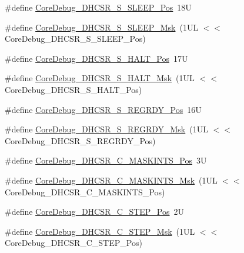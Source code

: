 \begin{DoxyCompactItemize}
\item 
\#define \mbox{\hyperlink{group___c_m_s_i_s___core_debug_ga349ccea33accc705595624c2d334fbcb}{Core\+Debug\+\_\+\+D\+H\+C\+S\+R\+\_\+\+S\+\_\+\+S\+L\+E\+E\+P\+\_\+\+Pos}}~18U
\item 
\#define \mbox{\hyperlink{group___c_m_s_i_s___core_debug_ga98d51538e645c2c1a422279cd85a0a25}{Core\+Debug\+\_\+\+D\+H\+C\+S\+R\+\_\+\+S\+\_\+\+S\+L\+E\+E\+P\+\_\+\+Msk}}~(1\+U\+L $<$$<$ Core\+Debug\+\_\+\+D\+H\+C\+S\+R\+\_\+\+S\+\_\+\+S\+L\+E\+E\+P\+\_\+\+Pos)
\item 
\#define \mbox{\hyperlink{group___c_m_s_i_s___core_debug_ga760a9a0d7f39951dc3f07d01f1f64772}{Core\+Debug\+\_\+\+D\+H\+C\+S\+R\+\_\+\+S\+\_\+\+H\+A\+L\+T\+\_\+\+Pos}}~17U
\item 
\#define \mbox{\hyperlink{group___c_m_s_i_s___core_debug_ga9f881ade3151a73bc5b02b73fe6473ca}{Core\+Debug\+\_\+\+D\+H\+C\+S\+R\+\_\+\+S\+\_\+\+H\+A\+L\+T\+\_\+\+Msk}}~(1\+U\+L $<$$<$ Core\+Debug\+\_\+\+D\+H\+C\+S\+R\+\_\+\+S\+\_\+\+H\+A\+L\+T\+\_\+\+Pos)
\item 
\#define \mbox{\hyperlink{group___c_m_s_i_s___core_debug_ga20a71871ca8768019c51168c70c3f41d}{Core\+Debug\+\_\+\+D\+H\+C\+S\+R\+\_\+\+S\+\_\+\+R\+E\+G\+R\+D\+Y\+\_\+\+Pos}}~16U
\item 
\#define \mbox{\hyperlink{group___c_m_s_i_s___core_debug_gac4cd6f3178de48f473d8903e8c847c07}{Core\+Debug\+\_\+\+D\+H\+C\+S\+R\+\_\+\+S\+\_\+\+R\+E\+G\+R\+D\+Y\+\_\+\+Msk}}~(1\+U\+L $<$$<$ Core\+Debug\+\_\+\+D\+H\+C\+S\+R\+\_\+\+S\+\_\+\+R\+E\+G\+R\+D\+Y\+\_\+\+Pos)
\item 
\#define \mbox{\hyperlink{group___c_m_s_i_s___core_debug_ga0d2907400eb948a4ea3886ca083ec8e3}{Core\+Debug\+\_\+\+D\+H\+C\+S\+R\+\_\+\+C\+\_\+\+M\+A\+S\+K\+I\+N\+T\+S\+\_\+\+Pos}}~3U
\item 
\#define \mbox{\hyperlink{group___c_m_s_i_s___core_debug_ga77fe1ef3c4a729c1c82fb62a94a51c31}{Core\+Debug\+\_\+\+D\+H\+C\+S\+R\+\_\+\+C\+\_\+\+M\+A\+S\+K\+I\+N\+T\+S\+\_\+\+Msk}}~(1\+U\+L $<$$<$ Core\+Debug\+\_\+\+D\+H\+C\+S\+R\+\_\+\+C\+\_\+\+M\+A\+S\+K\+I\+N\+T\+S\+\_\+\+Pos)
\item 
\#define \mbox{\hyperlink{group___c_m_s_i_s___core_debug_gae1fc39e80de54c0339cbb1b298a9f0f9}{Core\+Debug\+\_\+\+D\+H\+C\+S\+R\+\_\+\+C\+\_\+\+S\+T\+E\+P\+\_\+\+Pos}}~2U
\item 
\#define \mbox{\hyperlink{group___c_m_s_i_s___core_debug_gae6bda72fbd32cc5734ff3542170dc00d}{Core\+Debug\+\_\+\+D\+H\+C\+S\+R\+\_\+\+C\+\_\+\+S\+T\+E\+P\+\_\+\+Msk}}~(1\+U\+L $<$$<$ Core\+Debug\+\_\+\+D\+H\+C\+S\+R\+\_\+\+C\+\_\+\+S\+T\+E\+P\+\_\+\+Pos)
$$
\end{DoxyCompactItemize}
